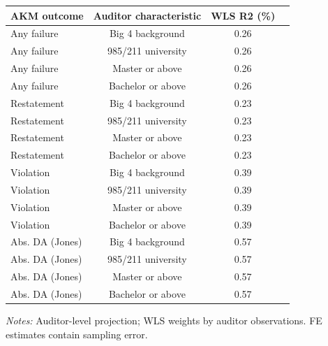 \documentclass[10pt]{article}
\begin{document}
\begin{minipage}{19cm}\fontsize{10}{12}\selectfont\setlength{\tabcolsep}{4pt}\renewcommand{\arraystretch}{1.12}


\centering
{}
\begin{threeparttable}
\begin{tabular}{p{}ccc}
\toprule
AKM outcome & Auditor characteristic & WLS R2 (\%) &  \\
\midrule
Any failure & Big 4 background & 0.26 &  \\
Any failure & 985/211 university & 0.26 &  \\
Any failure & Master or above & 0.26 &  \\
Any failure & Bachelor or above & 0.26 &  \\
Restatement & Big 4 background & 0.23 &  \\
Restatement & 985/211 university & 0.23 &  \\
Restatement & Master or above & 0.23 &  \\
Restatement & Bachelor or above & 0.23 &  \\
Violation & Big 4 background & 0.39 &  \\
Violation & 985/211 university & 0.39 &  \\
Violation & Master or above & 0.39 &  \\
Violation & Bachelor or above & 0.39 &  \\
Abs. DA (Jones) & Big 4 background & 0.57 &  \\
Abs. DA (Jones) & 985/211 university & 0.57 &  \\
Abs. DA (Jones) & Master or above & 0.57 &  \\
Abs. DA (Jones) & Bachelor or above & 0.57 &  \\
\bottomrule
\end{tabular}
\begin{tablenotes}\fontsize{9}{11}\selectfont
\item \raggedright \fontsize{9}{11}\selectfont \textit{Notes:} Auditor-level projection; WLS weights by auditor observations. FE estimates contain sampling error.
\end{tablenotes}
\end{threeparttable}

\end{minipage}
\end{document}
